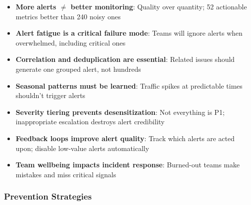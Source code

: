 \begin{itemize}
    \item \textbf{More alerts $\neq$ better monitoring}: Quality over quantity; 52 actionable metrics better than 240 noisy ones
    \item \textbf{Alert fatigue is a critical failure mode}: Teams will ignore alerts when overwhelmed, including critical ones
    \item \textbf{Correlation and deduplication are essential}: Related issues should generate one grouped alert, not hundreds
    \item \textbf{Seasonal patterns must be learned}: Traffic spikes at predictable times shouldn't trigger alerts
    \item \textbf{Severity tiering prevents desensitization}: Not everything is P1; inappropriate escalation destroys alert credibility
    \item \textbf{Feedback loops improve alert quality}: Track which alerts are acted upon; disable low-value alerts automatically
    \item \textbf{Team wellbeing impacts incident response}: Burned-out teams make mistakes and miss critical signals
\end{itemize}

\subsubsection{Prevention Strategies}

